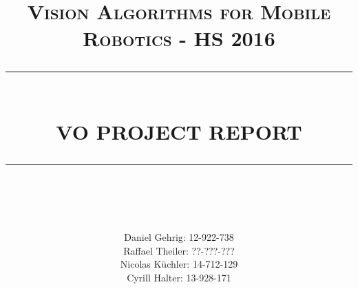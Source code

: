 \documentclass[12pt]{report}
\newcommand{\HRule}[1]{\rule{\linewidth}{#1}}
\begin{document}
\title{ \normalsize \textsc{Vision Algorithms for Mobile Robotics - HS 2016}
\\ [2.0cm]
\HRule{0.5pt} \\
\LARGE \textbf{\uppercase{VO Project Report}}
\HRule{2pt} \\ [0.5cm]
}

\author{
Daniel Gehrig: 12-922-738 \\
Raffael Theiler: ??-???-??? \\
Nicolas Küchler: 14-712-129 \\
Cyrill Halter: 13-928-171 }
\date{}

\maketitle
\tableofcontents
\newpage

\sectionfont{\scshape}
\titlespacing*{\chapter}{0pt}{-20pt}{30pt}

%





\end{document}
